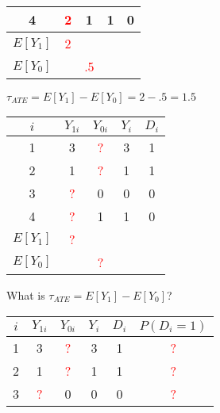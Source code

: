 \documentclass{beamer}
\numberwithin{equation}{section}
\begin{document}
\begin{frame}
\begin{overprint}
\begin{center}
\begin{tabular}{ccccc}
\rowcolor{gray!30}         4 &          \textcolor{red}{2} &         1 &          1 &          0 \\
\hline
$E[Y_1]$& \textcolor{red}{2} & & &    \\
$E[Y_0]$&  & \textcolor{red}{.5} &  &    \\
\end{tabular}
\end{center}
\bigskip
$\tau_{ATE}=E[Y_1] -E[Y_0]=2-.5=1.5$
\begin{center}
\begin{tabular}{ccccc}
 \multicolumn{1}{p{2cm}}{\center $i$} &   \multicolumn{1}{p{1cm}}{\center $Y_{1i}$} & \multicolumn{1}{p{1cm}}{\center $Y_{0i}$}&    \multicolumn{1}{p{1cm}}{\center $Y_{i}$} &   \multicolumn{1}{p{1cm}}{\center $D_{i}$}  \\
\hline
\rowcolor{gray!10}        1 &          3 &         \textcolor{red}{?} &          3 &          1  \\
\rowcolor{gray!10}         2 &         1 &          \textcolor{red}{?} &          1 &          1   \\
\rowcolor{gray!30}         3 &          \textcolor{red}{?} &         0 &          0 &          0  \\
\rowcolor{gray!30}         4 &          \textcolor{red}{?} &         1 &          1 &          0  \\
\hline
$E[Y_1]$& \textcolor{red}{?} & & &    \\
$E[Y_0]$&  & \textcolor{red}{?} &  &    \\
\hline
\end{tabular}
\end{center}
\bigskip
What is $\tau_{ATE}=E[Y_1] -E[Y_0]$?
\begin{center}
\begin{tabular}{cccccc}
 \multicolumn{1}{p{2cm}}{\center $i$} &   \multicolumn{1}{p{1cm}}{\center $Y_{1i}$} & \multicolumn{1}{p{1cm}}{\center $Y_{0i}$}&    \multicolumn{1}{p{1cm}}{\center $Y_{i}$} &   \multicolumn{1}{p{1cm}}{\center $D_{i}$}   &   \multicolumn{1}{p{2cm}}{\center $P(D_{i}=1)$}   \\
\hline
\rowcolor{gray!10}        1 &          3 &         \textcolor{red}{?} &          3 &          1  & \textcolor{red}{?} \\
\rowcolor{gray!10}         2 &         1 &          \textcolor{red}{?} &          1 &          1 & \textcolor{red}{?}  \\
\rowcolor{gray!30}         3 &          \textcolor{red}{?} &         0 &          0 &          0  & \textcolor{red}{?} \\

\end{tabular}
\end{center}
\end{overprint}
\end{frame}
\end{document}

